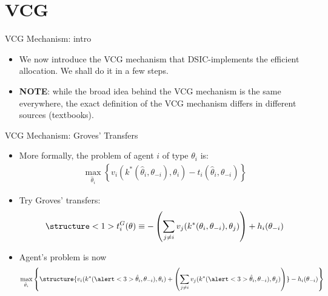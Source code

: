 \documentclass[english,10pt
,aspectratio=169
]{beamer}
\begin{document}
\section{VCG}

\begin{frame}{VCG Mechanism: intro}
\begin{itemize}
	\item We now introduce the VCG mechanism that DSIC-implements the efficient allocation. We shall do it in a few steps.
	\item \textbf{NOTE}: while the broad idea behind the VCG mechanism is the same everywhere, the \alert{exact definition} of the VCG mechanism \alert{differs} in different sources (textbooks).
\end{itemize}
\end{frame}


\begin{frame}{VCG Mechanism: Groves' Transfers}
\begin{itemize}
	\item More formally, the problem of agent $i$ of type $\theta_i$ is:
	\vspace{-0.5em}\begin{align*}
	\max_{\hat{\theta}_i} \left\{  v_i(k^*(\hat{\theta}_i,\theta_{-i}),\theta_i) - t_i(\hat{\theta}_i,\theta_{-i}) \right\}
	\end{align*}\vspace{-1em}
	\item Try \alert<1>{Groves' transfers}:
	\vspace{-0.5em}\begin{align*}
	\structure<1>{ t^G_{i}(\theta) \equiv -\left(\sum_{j\neq i} v_{j}(k^*(\theta_i, \theta_{-i}), \theta_{j}) \right) + h_{i}(\theta_{-i}) }
	\end{align*}\vspace{-1em}
	\item Agent's problem is now
	\vspace{-0.5em}\begin{align*}
	\max_{\hat{\theta}_i} \left\{ \structure{v_i(k^*(\alert<3>{\hat{\theta}_i},\theta_{-i}),\theta_i) + \left( \sum_{j\neq i} v_{j}(k^*(\alert<3>{\hat{\theta}_i},\theta_{-i}), \theta_{j}) \right)} - h_{i}(\theta_{-i}) \right\}
	\end{align*}
\end{itemize}
\end{frame}
\end{document}
